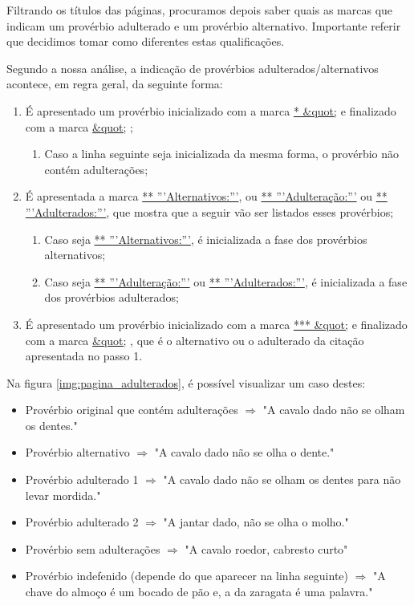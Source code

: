 \documentclass[11pt,a4paper]{report}
\begin{document}
Filtrando os títulos das páginas, procuramos depois saber quais as marcas que indicam um provérbio adulterado e um provérbio alternativo. Importante referir que decidimos tomar como diferentes estas qualificações.

\vspace{0.2cm}

Segundo a nossa análise, a indicação de provérbios adulterados/alternativos acontece, em regra geral, da seguinte forma:
\begin{enumerate}
\item É apresentado um provérbio inicializado com a marca \underline{* \&quot;} e finalizado com a marca \underline{\&quot;} ;
	\begin{enumerate}
		\item Caso a linha seguinte seja inicializada da mesma forma, o provérbio não contém adulterações;
	\end{enumerate}
\item É apresentada a marca \underline{** '''Alternativos:'''}, ou \underline{** '''Adulteração:'''} ou \underline{** '''Adulterados:'''}, que mostra que a seguir vão ser listados esses provérbios;
	\begin{enumerate}
		\item Caso seja \underline{** '''Alternativos:'''}, é inicializada a fase dos provérbios alternativos;
		\item Caso seja \underline{** '''Adulteração:'''} ou \underline{** '''Adulterados:'''}, é inicializada a fase dos provérbios adulterados;
	\end{enumerate}
\item É apresentado um provérbio inicializado com a marca \underline{*** \&quot;} e finalizado com a marca \underline{\&quot;} , que é o alternativo ou o adulterado da citação apresentada no passo 1.
\end{enumerate}

\vspace{0.2cm}

Na figura \ref{img:pagina_adulterados}, é possível visualizar um caso destes:

\begin{itemize}
\item Provérbio original que contém adulterações $\Rightarrow$ "A cavalo dado não se olham os dentes."
\item Provérbio alternativo $\Rightarrow$ "A cavalo dado não se olha o dente."
\item Provérbio adulterado 1 $\Rightarrow$ "A cavalo dado não se olham os dentes para não levar mordida."
\item Provérbio adulterado 2 $\Rightarrow$ "A jantar dado, não se olha o molho."
\item Provérbio sem adulterações $\Rightarrow$ "A cavalo roedor, cabresto curto"
\item Provérbio indefenido (depende do que aparecer na linha seguinte) $\Rightarrow$ "A chave do almoço é um bocado de pão e, a da zaragata é uma palavra."
\end{itemize}
\end{document}
